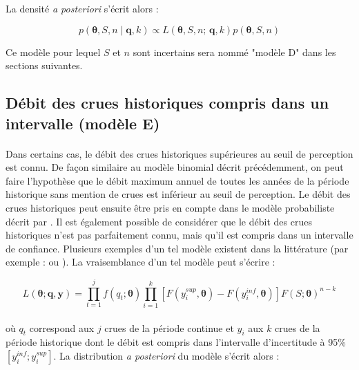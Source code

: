 		La densité \textit{a posteriori} s'écrit alors :
					
			\begin{equation}
				p(\boldsymbol{\theta}, S, n \mid \boldsymbol{q},k) \propto L(\boldsymbol{\theta},S, n;\,\boldsymbol{q},k) p(\boldsymbol{\theta},S, n)
				\label{eq:Bayes_uSN}
			\end{equation}

	Ce modèle pour lequel $S$ et $n$ sont incertains sera nommé "modèle D" dans les sections suivantes. 
	
	\subsection{Débit des crues historiques compris dans un intervalle (modèle E)}
	\label{subsec:modE}	
		
	\paragraph{} Dans certains cas, le débit des crues historiques supérieures au seuil de perception est connu. De façon similaire au modèle binomial décrit précédemment, on peut faire l'hypothèse que le débit maximum annuel de toutes les années de la période historique sans mention de crues est inférieur au seuil de perception. Le débit des crues historiques peut ensuite être pris en compte dans le modèle probabiliste décrit par \citet{stedinger_flood_1986}. Il est également possible de considérer que le débit des crues historiques n'est pas parfaitement connu, mais qu'il est compris dans un intervalle de confiance. Plusieurs exemples d'un tel modèle existent dans la littérature (par exemple : \citet{payrastre_usefulness_2011} ou \citet{parkes_defining_2016}). La vraisemblance d'un tel modèle peut s'écrire : 

		\begin{equation}
					L(\boldsymbol{\theta} ; \boldsymbol{q}, \boldsymbol{y}) =\prod_{t=1}^j f\left(q_t;\boldsymbol{\theta}\right) \prod_{i=1}^k \left[F(y_{i}^{sup},\boldsymbol{\theta} ) - F(y_i^{inf},\boldsymbol{\theta})\right]  F\left(S;\boldsymbol{\theta}\right)^{n-k}
		\label{eq:Censure}
		\end{equation}
					
		\paragraph{}où $q_t$ correspond aux $j$ crues de la période continue et $y_i$ aux $k$ crues de la période historique dont le débit est compris dans l'intervalle d'incertitude à 95\% $\left[y_i^{inf} ; y_i^{sup}\right]$. La distribution \textit{a posteriori} du modèle s'écrit alors : 
				
